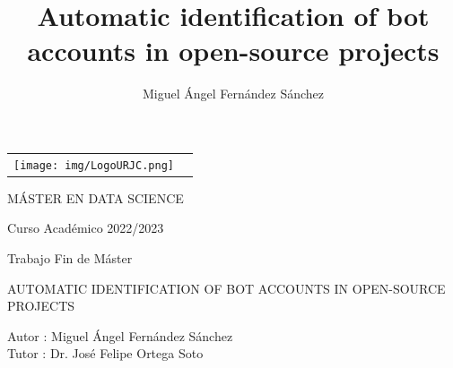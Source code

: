 \documentclass[a4paper, 12pt]{book}
\title{Automatic identification of bot accounts in open-source projects}
\author{Miguel Ángel Fernández Sánchez}
\begin{document}
 


\begin{titlepage}
\begin{center}
\begin{tabular}[c]{c c}
\texttt{[image: img/LogoURJC.png]}
\\
\end{tabular}

\vspace{3cm}

\Large 
MÁSTER EN DATA SCIENCE

\vspace{0.4cm}

\large
Curso Académico 2022/2023

\vspace{0.8cm}

Trabajo Fin de Máster

\vspace{2cm}

\LARGE AUTOMATIC IDENTIFICATION OF BOT ACCOUNTS IN OPEN-SOURCE PROJECTS
\vspace{3cm}

\large
Autor : Miguel Ángel Fernández Sánchez \\
Tutor : Dr. José Felipe Ortega Soto
\end{center}
\end{titlepage}

\newpage
\mbox{}
\thispagestyle{empty} %


\clearpage
{}
\chapter*{}
\end{document}
